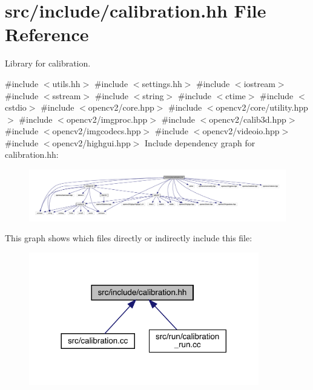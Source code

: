 \hypertarget{calibration_8hh}{}\section{src/include/calibration.hh File Reference}
\label{calibration_8hh}


Library for calibration.  


{\ttfamily \#include $<$utils.\+hh$>$}\newline
{\ttfamily \#include $<$settings.\+hh$>$}\newline
{\ttfamily \#include $<$iostream$>$}\newline
{\ttfamily \#include $<$sstream$>$}\newline
{\ttfamily \#include $<$string$>$}\newline
{\ttfamily \#include $<$ctime$>$}\newline
{\ttfamily \#include $<$cstdio$>$}\newline
{\ttfamily \#include $<$opencv2/core.\+hpp$>$}\newline
{\ttfamily \#include $<$opencv2/core/utility.\+hpp$>$}\newline
{\ttfamily \#include $<$opencv2/imgproc.\+hpp$>$}\newline
{\ttfamily \#include $<$opencv2/calib3d.\+hpp$>$}\newline
{\ttfamily \#include $<$opencv2/imgcodecs.\+hpp$>$}\newline
{\ttfamily \#include $<$opencv2/videoio.\+hpp$>$}\newline
{\ttfamily \#include $<$opencv2/highgui.\+hpp$>$}\newline
Include dependency graph for calibration.\+hh\+:
\nopagebreak
\begin{figure}[H]
\begin{center}
\leavevmode
\includegraphics[width=350pt]{calibration_8hh__incl}
\end{center}
\end{figure}
This graph shows which files directly or indirectly include this file\+:
\nopagebreak
\begin{figure}[H]
\begin{center}
\leavevmode
\includegraphics[width=284pt]{calibration_8hh__dep__incl}
\end{center}
\end{figure}
